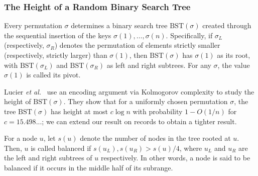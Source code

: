 \documentclass{patmorin}
\begin{document}
\subsubsection{The Height of a Random Binary Search Tree}

Every permutation $\sigma$ determines a binary search tree
$\text{BST}(\sigma)$ created through the sequential insertion of the
keys $\sigma(1), \ldots, \sigma(n)$. Specifically, if $\sigma_L$
(respectively, $\sigma_R$) denotes the permutation of elements
strictly smaller (respectively, strictly larger) than $\sigma(1)$,
then $\text{BST}(\sigma)$ has $\sigma(1)$ as its root, with
$\text{BST}(\sigma_L)$ and $\text{BST}(\sigma_R)$ as left and right
subtrees. For any $\sigma$, the value $\sigma(1)$ is called its pivot.

Lucier \emph{et al.}~\cite{lucier.jiang.li:quicksort} use an encoding
argument via Kolmogorov complexity to study the height of
$\text{BST}(\sigma)$. They show that for a uniformly chosen
permutation $\sigma$, the tree $\text{BST}(\sigma)$ has height at most
$c \log n$ with probability $1 - O(1/n)$ for $c = 15.498...$; we can
extend our result on records to obtain a tighter result.

For a node $u$, let $s(u)$ denote the number of nodes in the tree
rooted at $u$. Then, $u$ is called balanced if
$s(u_L), s(u_R) > s(u)/4$, where $u_L$ and $u_R$ are the left and
right subtrees of $u$ respectively. In other words, a node is said to
be balanced if it occurs in the middle half of its subrange.
\end{document}
